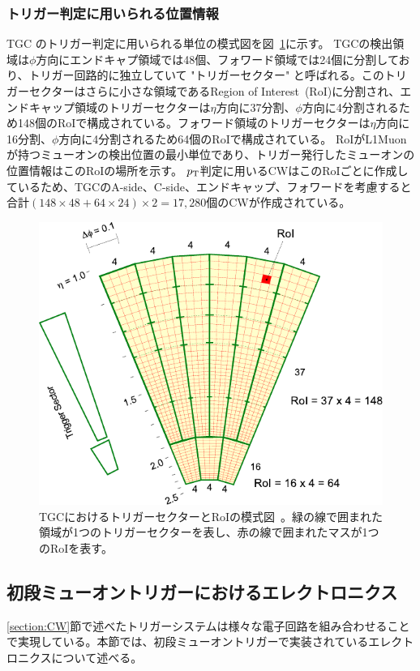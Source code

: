 \subsubsection{トリガー判定に用いられる位置情報}
TGC のトリガー判定に用いられる単位の模式図を図~\ref{fig:RoI}に示す。
TGCの検出領域は$\phi$方向にエンドキャプ領域では48個、フォワード領域では24個に分割しており、トリガー回路的に独立していて "トリガーセクター" と呼ばれる。このトリガーセクターはさらに小さな領域であるRegion of Interest~(RoI)に分割され、エンドキャップ領域のトリガーセクターは$\eta$方向に37分割、$\phi$方向に4分割されるため148個のRoIで構成されている。フォワード領域のトリガーセクターは$\eta$方向に16分割、$\phi$方向に4分割されるため64個のRoIで構成されている。
RoIがL1Muonが持つミューオンの検出位置の最小単位であり、トリガー発行したミューオンの位置情報はこのRoIの場所を示す。
$p_{\rm{T}}$判定に用いるCWはこのRoIごとに作成しているため、TGCのA-side、C-side、エンドキャップ、フォワードを考慮すると合計$(148\times48+64\times24)\times2=17,280$個のCWが作成されている。

\begin{figure}[tb]
  \centering
  \includegraphics[clip, width=12cm]{fig/3/RoI.pdf}
  \caption{TGCにおけるトリガーセクターとRoIの模式図~\cite{article:phase1}。緑の線で囲まれた領域が1つのトリガーセクターを表し、赤の線で囲まれたマスが1つのRoIを表す。}
  \label{fig:RoI}
\end{figure}



\newpage
\subsection{初段ミューオントリガーにおけるエレクトロニクス}
\ref{section:CW}節で述べたトリガーシステムは様々な電子回路を組み合わせることで実現している。本節では、初段ミューオントリガーで実装されているエレクトロニクスについて述べる。

